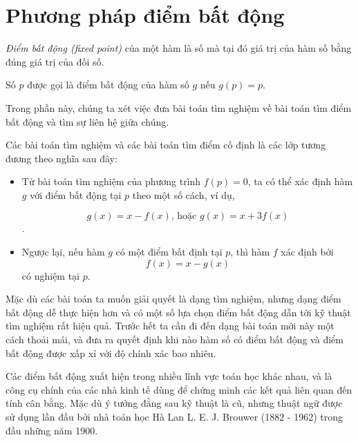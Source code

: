 \documentclass[../../Lectures.tex]{subfiles}
\begin{document}

\section{Phương pháp điểm bất động}

\emph{Điểm bất động (fixed point)} của một hàm là số mà tại đó giá trị của hàm
số bằng đúng giá trị của đối số.

\begin{definition}
    Số \(p\) được gọi là điểm bất động của hàm số \(g\) nếu \(g(p) = p\).
\end{definition}

Trong phần này, chúng ta xét việc đưa bài toán tìm nghiệm về bài toán tìm điểm
bất động và tìm sự liên hệ giữa chúng.

Các bài toán tìm nghiệm và các bài toán tìm điểm cố định là các lớp tương đương
theo nghĩa sau đây:
\begin{itemize}
    \item Từ bài toán tìm nghiệm của phương trình \(f(p) = 0\), ta có thể xác
        định hàm \(g\) với điểm bất động tại \(p\) theo một số cách, ví dụ,

        \[g(x) = x - f(x) \text{, hoặc } g(x) = x + 3f(x)\].

    \item Ngược lại, nếu hàm \(g\) có một điểm bất định tại \(p\), thì hàm \(f\)
        xác định bởi \[f(x) = x - g(x)\] có nghiệm tại \(p\).
\end{itemize}

Mặc dù các bài toán ta muốn giải quyết là dạng tìm nghiệm, nhưng dạng điểm bất
động dễ thực hiện hơn và có một số lựa chọn điểm bất động dẫn tới kỹ thuật tìm
nghiệm rất hiệu quả. Trước hết ta cần đi đến dạng bài toán mới này một cách
thoải mái, và đưa ra quyết định khi nào hàm số có điểm bất động và điểm bất động
được xấp xỉ với độ chính xác bao nhiêu.

Các điểm bất động xuất hiện trong nhiều lĩnh vực toán học khác nhau, và là công
cụ chính của các nhà kinh tế dùng để chứng minh các kết quả liên quan đến tính
cân bằng. Mặc dù ý tưởng đằng sau kỹ thuật là cũ, nhưng thuật ngữ được sử dụng
lần đầu bởi nhà toán học Hà Lan L. E. J. Brouwer (1882 - 1962) trong đầu những
năm 1900.
\end{document}
